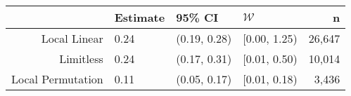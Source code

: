 \begin{tabular}{rlllr}
  \hline
 & Estimate & 95\% CI & $\mathcal{W}$ & n \\ 
  \hline
Local Linear & 0.24 & (0.19, 0.28) & [0.00, 1.25) & 26,647 \\ 
  Limitless & 0.24 & (0.17, 0.31) & [0.01, 0.50) & 10,014 \\ 
  Local Permutation & 0.11 & (0.05, 0.17) & [0.01, 0.18) & 3,436 \\ 
   \hline
\end{tabular}
